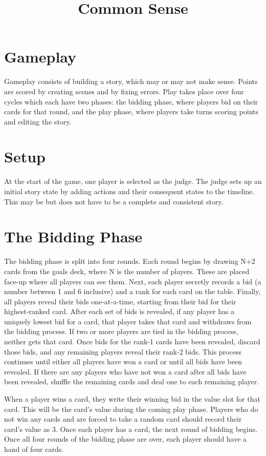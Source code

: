 \documentclass[12pt]{article}
\title{Common Sense}
\date{}
\begin{document}
\maketitle

\section{Gameplay}
%
Gameplay consists of building a story, which may or may not make sense.
%
Points are scored by creating scenes and by fixing errors.
%
Play takes place over four cycles which each have two phases: the bidding phase, where players bid on their cards for that round, and the play phase, where players take turns scoring points and editing the story.
%

\section{Setup}
%
At the start of the game, one player is selected as the judge.
%
The judge sets up an initial story state by adding actions and their consequent states to the timeline.
%
This may be but does not have to be a complete and consistent story.
%

\section{The Bidding Phase}
%
The bidding phase is split into four rounds.
%
Each round begins by drawing N+2 cards from the goals deck, where N is the number of players.
%
These are placed face-up where all players can see them.
%
Next, each player secretly records a bid (a number between 1 and 6 inclusive) and a rank for each card on the table.
%
Finally, all players reveal their bids one-at-a-time, starting from their bid for their highest-ranked card.
%
After each set of bids is revealed, if any player has a uniquely lowest bid for a card, that player takes that card and withdraws from the bidding process.
%
If two or more players are tied in the bidding process, neither gets that card.
%
Once bids for the rank-1 cards have been revealed, discard those bids, and any remaining players reveal their rank-2 bids.
%
This process continues until either all players have won a card or until all bids have been revealed.
%
If there are any players who have not won a card after all bids have been revealed, shuffle the remaining cards and deal one to each remaining player.


When a player wins a card, they write their winning bid in the value slot for that card.
%
This will be the card's value during the coming play phase.
%
Players who do not win any cards and are forced to take a random card should record their card's value as 3.
%
Once each player has a card, the next round of bidding begins.
%
Once all four rounds of the bidding phase are over, each player should have a hand of four cards.
\end{document}

